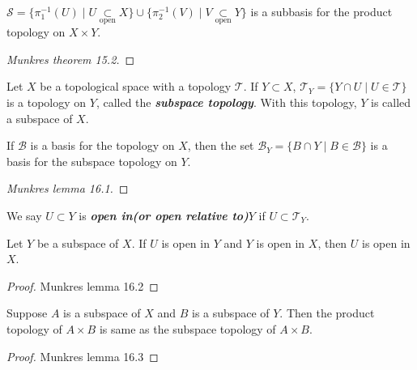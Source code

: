 \begin{mytheorem}
$\mathcal{S}=\{\pi_1^{-1}(U)\mid U\underset{\text{open}}{\subset}X\} \cup \{\pi_2^{-1}(V)\mid V\underset{\text{open}}{\subset}Y\}$ is a subbasis for the product topology on $X\times Y$.
\end{mytheorem}
\begin{proof}
[Munkres theorem 15.2]
\end{proof}

\begin{mydefinition}
Let $X$ be a topological space with a topology $\mathcal{T}$. If $Y\subset X$, $\mathcal{T}_Y=\{Y\cap U\mid U\in \mathcal{T}\}$ is a topology on $Y$, called the \textbf{\emph{subspace topology}}. With this topology, $Y$ is called a subspace of $X$.
\end{mydefinition}

\begin{mylemma}
If $\mathcal{B}$ is a basis for the topology on $X$, then the set $\mathcal{B}_Y=\{B\cap Y\mid B\in \mathcal{B}\}$ is a basis for the subspace topology on $Y$.
\end{mylemma}
\begin{proof}
[Munkres lemma 16.1]
\end{proof}

\begin{notebox}
We say $U\subset Y$ is \textbf{\emph{open in(or open relative to)}}$Y$ if $U\subset \mathcal{T}_Y$.
\end{notebox}

\begin{mylemma}
Let $Y$ be a subspace of $X$. If $U$ is open in $Y$ and $Y$ is open in $X$, then $U$ is open in $X$.
\end{mylemma}
\begin{proof}
Munkres lemma 16.2
\end{proof}

\begin{mytheorem}
Suppose $A$ is a subspace of $X$ and $B$ is a subspace of $Y$. Then the product topology of $A\times B$ is same as the subspace topology of $A\times B$.
\end{mytheorem}
\begin{proof}
Munkres lemma 16.3
\end{proof}

